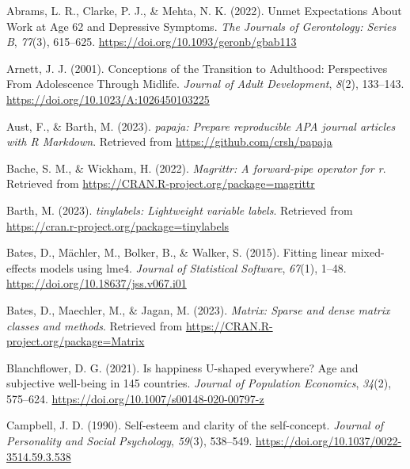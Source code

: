 \documentclass[
  man,floatsintext]{apa6}
\newlength{\cslhangindent}
\newlength{\cslentryspacingunit} %
\newenvironment{CSLReferences}[2] %
 {%
  \setlength{\parindent}{0pt}
  \ifodd #1
  \let\oldpar\par
  \def\par{\hangindent=\cslhangindent\oldpar}
  \fi
  \setlength{\parskip}{#2\cslentryspacingunit}
 }%
 {}
\begin{document}
\hypertarget{refs}{}
\begin{CSLReferences}{1}{0}
\leavevmode{}%
Abrams, L. R., Clarke, P. J., \& Mehta, N. K. (2022). Unmet {Expectations About Work} at {Age} 62 and {Depressive Symptoms}. \emph{The Journals of Gerontology: Series B}, \emph{77}(3), 615--625. \url{https://doi.org/10.1093/geronb/gbab113}

\leavevmode{}%
Arnett, J. J. (2001). Conceptions of the {Transition} to {Adulthood}: {Perspectives From Adolescence Through Midlife}. \emph{Journal of Adult Development}, \emph{8}(2), 133--143. \url{https://doi.org/10.1023/A:1026450103225}

\leavevmode{}%
Aust, F., \& Barth, M. (2023). \emph{{papaja}: {Prepare} reproducible {APA} journal articles with {R Markdown}}. Retrieved from \url{https://github.com/crsh/papaja}

\leavevmode{}%
Bache, S. M., \& Wickham, H. (2022). \emph{Magrittr: A forward-pipe operator for r}. Retrieved from \url{https://CRAN.R-project.org/package=magrittr}

\leavevmode{}%
Barth, M. (2023). \emph{{tinylabels}: Lightweight variable labels}. Retrieved from \url{https://cran.r-project.org/package=tinylabels}

\leavevmode{}%
Bates, D., Mächler, M., Bolker, B., \& Walker, S. (2015). Fitting linear mixed-effects models using {lme4}. \emph{Journal of Statistical Software}, \emph{67}(1), 1--48. \url{https://doi.org/10.18637/jss.v067.i01}

\leavevmode{}%
Bates, D., Maechler, M., \& Jagan, M. (2023). \emph{Matrix: Sparse and dense matrix classes and methods}. Retrieved from \url{https://CRAN.R-project.org/package=Matrix}

\leavevmode{}%
Blanchflower, D. G. (2021). Is happiness {U-shaped} everywhere? {Age} and subjective well-being in 145 countries. \emph{Journal of Population Economics}, \emph{34}(2), 575--624. \url{https://doi.org/10.1007/s00148-020-00797-z}

\leavevmode{}%
Campbell, J. D. (1990). Self-esteem and clarity of the self-concept. \emph{Journal of Personality and Social Psychology}, \emph{59}(3), 538--549. \url{https://doi.org/10.1037/0022-3514.59.3.538}


\end{CSLReferences}
\end{document}
